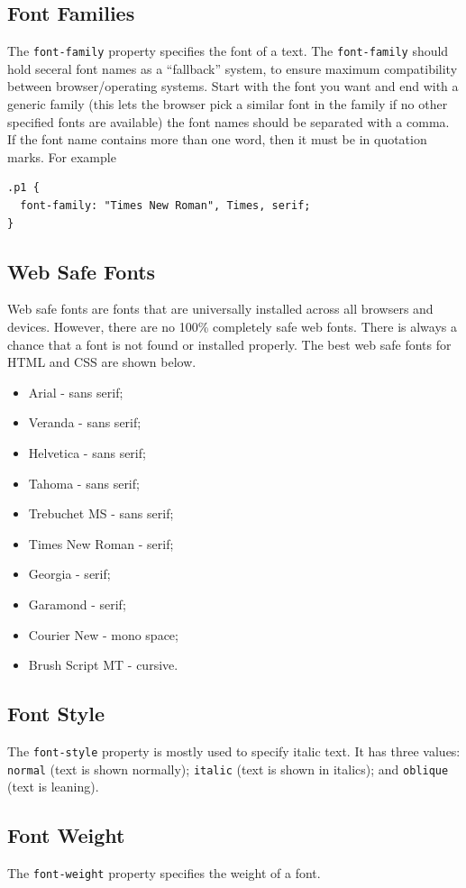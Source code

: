 \documentclass{thomasClass}
\begin{document}
\subsection{Font Families}
The \verb|font-family| property specifies the font of a text. The \verb|font-family| should hold seceral font names as a ``fallback'' system, to ensure maximum compatibility between browser/operating systems. Start with the font you want and end with a generic family (this lets the browser pick a similar font in the family if no other specified fonts are available) the font names should be separated with a comma. If the font name contains more than one word, then it must be in quotation marks. For example
\begin{Verbatim}[breaklines=true, breakanywhere=true]
.p1 {
  font-family: "Times New Roman", Times, serif;
}
\end{Verbatim}
\subsection{Web Safe Fonts}
Web safe fonts are fonts that are universally installed across all browsers and devices. However, there are no 100\% completely safe web fonts. There is always a chance that a font is not found or installed properly. The best web safe fonts for HTML and CSS are shown below.
\begin{itemize}
    \item Arial - sans serif;
    \item Veranda - sans serif;
    \item Helvetica - sans serif;
    \item Tahoma - sans serif;
    \item Trebuchet MS - sans serif;
    \item Times New Roman - serif;
    \item Georgia - serif;
    \item Garamond - serif;
    \item Courier New - mono space;
    \item Brush Script MT - cursive.
\end{itemize}
\subsection{Font Style}
The \verb|font-style| property is mostly used to specify italic text. It has three values: \verb|normal| (text is shown normally); \verb|italic| (text is shown in italics); and \verb|oblique| (text is leaning).
\subsection{Font Weight}
The \verb|font-weight| property specifies the weight of a font. 
\end{document}
